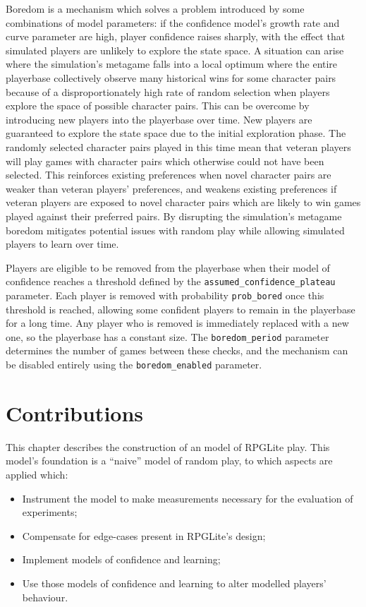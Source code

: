 Boredom is a mechanism which solves a problem introduced by some combinations of
model parameters: if the confidence model's growth rate and curve parameter are
high, player confidence raises sharply, with the effect that simulated players
are unlikely to explore the state space. A situation can arise where the
simulation's metagame falls into a local optimum where the entire playerbase
collectively observe many historical wins for some character pairs because of a
disproportionately high rate of random selection when players explore the space
of possible character pairs. This can be overcome by introducing new players
into the playerbase over time. New players are guaranteed to explore the state
space due to the initial exploration phase. The randomly selected character
pairs played in this time mean that veteran players will play games with
character pairs which otherwise could not have been selected. This reinforces
existing preferences when novel character pairs are weaker than veteran players'
preferences, and weakens existing preferences if veteran players are exposed to
novel character pairs which are likely to win games played against their
preferred pairs. By disrupting the simulation's metagame boredom mitigates
potential issues with random play while allowing simulated players to learn over
time.

Players are eligible to be removed from the playerbase when their model of
confidence reaches a threshold defined by the
\lstinline{assumed_confidence_plateau} parameter. Each player is removed with
probability \lstinline{prob_bored} once this threshold is reached, allowing some
confident players to remain in the playerbase for a long time. Any player who is
removed is immediately replaced with a new one, so the playerbase has a constant
size. The \lstinline{boredom_period} parameter determines the number of games
between these checks, and the mechanism can be disabled entirely using the
\lstinline{boredom_enabled} parameter.




\section{Contributions}

This chapter describes the construction of an \aspectoriented model of RPGLite
play. This model's foundation is a ``naive'' model of random play, to which
aspects are applied which:

\begin{itemize}
\item Instrument the model to make measurements necessary for the evaluation of
experiments;
\item Compensate for edge-cases present in RPGLite's design;
\item Implement models of confidence and learning;
\item Use those models of confidence and learning to alter modelled players' behaviour.
\end{itemize}

